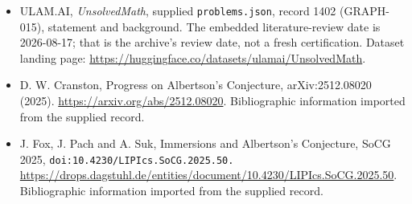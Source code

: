 \documentclass[11pt,a4paper]{article}
\begin{document}
{\small

\begin{itemize}

\item[\hypertarget{source:1402:1}{S1}] ULAM.AI, \emph{UnsolvedMath}, supplied \texttt{problems.json}, record 1402 (GRAPH-015), statement and background. The embedded literature-review date is 2026-08-17; that is the archive’s review date, not a fresh certification. Dataset landing page: \url{https://huggingface.co/datasets/ulamai/UnsolvedMath}.

\item[\hypertarget{source:1402:2}{S2}] D. W. Cranston, Progress on Albertson's Conjecture, arXiv:2512.08020 (2025). \url{https://arxiv.org/abs/2512.08020}. Bibliographic information imported from the supplied record.

\item[\hypertarget{source:1402:3}{S3}] J. Fox, J. Pach and A. Suk, Immersions and Albertson's Conjecture, SoCG 2025, \nolinkurl{doi:10.4230/LIPIcs.SoCG.2025.50.} \url{https://drops.dagstuhl.de/entities/document/10.4230/LIPIcs.SoCG.2025.50}. Bibliographic information imported from the supplied record.

\end{itemize}

}

\label{end:1402}
\end{document}
